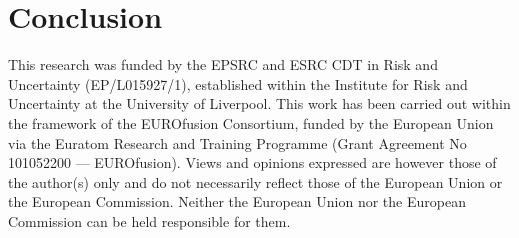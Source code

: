 \documentclass[twocolumn]{rps-esrel2022}
\begin{document}

\section{Conclusion}


\begin{acknowledgement}
	This research was funded by the EPSRC and ESRC CDT in Risk and Uncertainty (EP/L015927/1), established within
	the Institute for Risk and Uncertainty at the University of Liverpool.
	This work has been carried out within the framework of the EUROfusion Consortium, funded by the European Union
	via the Euratom Research and Training Programme (Grant Agreement No 101052200 — EUROfusion). Views and opinions
	expressed are however those of the author(s) only and do not necessarily reflect those of the European Union or
	the European Commission. Neither the European Union nor the European Commission can be held responsible for them.



\end{acknowledgement}
\end{document}
